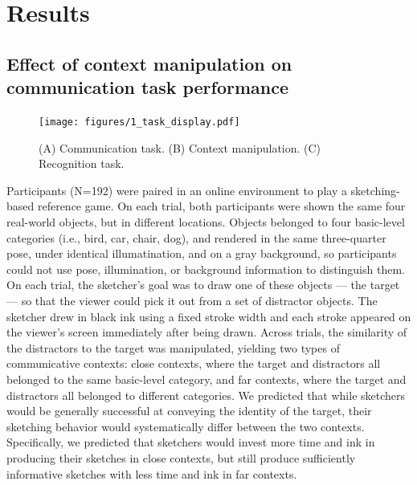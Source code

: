 \documentclass[9pt,twocolumn,twoside]{pnas-new}
\begin{document}
\section*{Results}

\subsection*{Effect of context manipulation on communication task performance}



\begin{figure}[htbp]
\centering
\texttt{[image: figures/1\_task\_display.pdf]}
\caption{(A) Communication task. (B) Context manipulation. (C) Recognition task.}
\label{task_display}
\end{figure}

Participants (N=192) were paired in an online environment to play a sketching-based reference game. On each trial, both participants were shown the same four real-world objects, but in different locations. Objects belonged to four basic-level categories (i.e., bird, car, chair, dog), and rendered in the same three-quarter pose, under identical illumatination, and on a gray background, so participants could not use pose, illumination, or background information to distinguish them. 
On each trial, the sketcher's goal was to draw one of these objects --- the target --- so that the viewer could pick it out from a set of distractor objects. 
The sketcher drew in black ink using a fixed stroke width and each stroke appeared on the viewer's screen immediately after being drawn. 
Across trials, the similarity of the distractors to the target was manipulated, yielding two types of communicative contexts: close contexts, where the target and distractors all belonged to the same basic-level category, and far contexts, where the target and distractors all belonged to different categories. 
We predicted that while sketchers would be generally successful at conveying the identity of the target, their sketching behavior would systematically differ between the two contexts. 
Specifically, we predicted that sketchers would invest more time and ink in producing their sketches in close contexts, but still produce sufficiently informative sketches with less time and ink in far contexts. 
\end{document}
